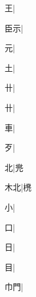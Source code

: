 \begin{multicols}{2}
{{\cjk{}{\cnsym{}　}{\cnsym{}　}王}|{}\par
{\cjk{}{\cnsym{}　}臣示}|{}\par
{\cjk{}{\cnsym{}　}{\cnsym{}　}元}|{}\par
{\cjk{}{\cnsym{}　}{\cnsym{}　}土}|{}\par
{\cjk{}{\cnsym{}　}{\cnsym{}　}卄}|{}\par
{\cjk{}{\cnsym{}　}{\cnsym{}　}卄}|{}\par
{\cjk{}{\cnsym{}　}{\cnsym{}　}車}|{}\par
{\cjk{}{\cnsym{}　}{\cnsym{}　}歹}|{}\par
{\cjk{}{\cnsym{}　}{\cnsym{}　}北}|{\cjk{}兠}\par
{\cjk{}{\cnsym{}　}木北}|{\cjk{}橷}\par
{\cjk{}{\cnsym{}　}{\cnsym{}　}小}|{}\par
{\cjk{}{\cnsym{}　}{\cnsym{}　}口}|{}\par
{\cjk{}{\cnsym{}　}{\cnsym{}　}日}|{}\par
{\cjk{}{\cnsym{}　}{\cnsym{}　}目}|{}\par
{\cjk{}{\cnsym{}　}巾門}|{}\par
}
\end{multicols}
